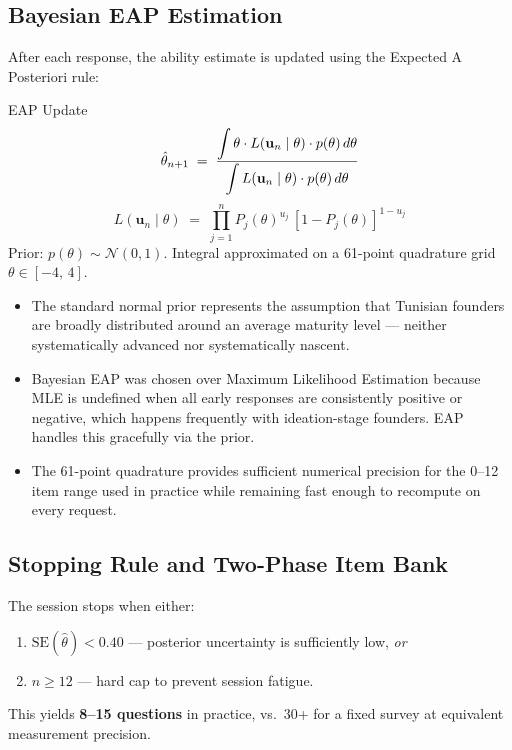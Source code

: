 \documentclass[11pt,a4paper]{article}
\begin{document}
\subsection{Bayesian EAP Estimation}

After each response, the ability estimate is updated using the Expected A Posteriori rule:

\begin{mathbox}{EAP Update}
\[
  \hat{\theta}_{n+1} \;=\;
  \frac{%
    \displaystyle\int \theta \cdot L(\mathbf{u}_n \mid \theta) \cdot p(\theta)\, d\theta
  }{%
    \displaystyle\int L(\mathbf{u}_n \mid \theta) \cdot p(\theta)\, d\theta
  }
\]
\[
  L(\mathbf{u}_n \mid \theta) \;=\; \prod_{j=1}^n P_j(\theta)^{u_j}\,[1-P_j(\theta)]^{1-u_j}
\]
Prior: $p(\theta) \sim \mathcal{N}(0,1)$.
Integral approximated on a 61-point quadrature grid $\theta \in [-4,\,4]$.
\end{mathbox}

\begin{itemize}
  \item The standard normal prior represents the assumption that Tunisian founders are
        broadly distributed around an average maturity level — neither systematically
        advanced nor systematically nascent.
  \item Bayesian EAP was chosen over Maximum Likelihood Estimation because MLE is undefined
        when all early responses are consistently positive or negative, which happens
        frequently with ideation-stage founders. EAP handles this gracefully via the prior.
  \item The 61-point quadrature provides sufficient numerical precision for the 0–12 item
        range used in practice while remaining fast enough to recompute on every request.
\end{itemize}

\subsection{Stopping Rule and Two-Phase Item Bank}

The session stops when either:
\begin{enumerate}
  \item $\text{SE}(\hat{\theta}) < 0.40$ — posterior uncertainty is sufficiently low, \emph{or}
  \item $n \geq 12$ — hard cap to prevent session fatigue.
\end{enumerate}

This yields \textbf{8–15 questions} in practice, vs.\ 30+ for a fixed survey
at equivalent measurement precision.
\end{document}
